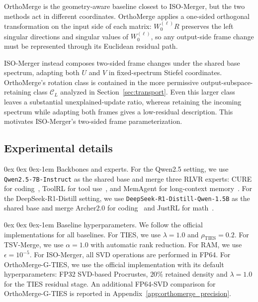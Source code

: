\documentclass[11pt, a4paper]{utda}
\makeatletter
\renewcommand{\paragraph}{%
  \@startsection{paragraph}{4}%
  {\z@}{0ex \@plus 0ex \@minus 0ex}{-1em}%
  {\normalfont\normalsize\bfseries}%
}
\theoremstyle{plain}
\theoremstyle{definition}
\theoremstyle{remark}
\makeatother
\begin{document}
OrthoMerge is the geometry-aware baseline closest to ISO-Merger, but the two
methods act in different coordinates. OrthoMerge applies a one-sided
orthogonal transformation on the input side of each matrix:
$W_0^{(\ell)}R$ preserves the left singular directions and singular values of
$W_0^{(\ell)}$, so any output-side frame change must be represented through
its Euclidean residual path.

ISO-Merger instead composes two-sided frame changes under the shared base
spectrum, adapting both $U$ and $V$ in fixed-spectrum Stiefel coordinates.
OrthoMerge's rotation class is contained in the more permissive
output-subspace-retaining class $\mathcal C_L$ analyzed in
Section~\ref{sec:transport}. Even this larger class leaves a substantial
unexplained-update ratio, whereas retaining the incoming spectrum while
adapting both frames gives a low-residual description. This motivates
ISO-Merger's two-sided frame parameterization.

\subsection{Experimental details}
\paragraph{Backbones and experts.}
For the Qwen2.5 setting, we use \texttt{Qwen2.5-7B-Instruct} as the shared base and merge three RLVR experts: CURE for coding~\cite{wang2025code}, ToolRL for tool use~\cite{qian2025toolrl}, and
MemAgent for long-context memory~\cite{yu2025memagent}. For the DeepSeek-R1-Distill setting, we use
\texttt{DeepSeek-R1-Distill-Qwen\allowbreak-1.5B} as the shared base and merge Archer2.0 for coding~\cite{archer} and JustRL for math~\cite{he2025justrl}.

\paragraph{Baseline hyperparameters.}
We follow the official implementations for all baselines. For TIES, we use
$\lambda=1.0$ and $\rho_{\mathrm{TIES}}=0.2$. For TSV-Merge, we use
$\alpha=1.0$ with automatic rank reduction. For RAM, we use
$\epsilon=10^{-5}$. For ISO-Merger, all SVD operations are performed in FP64. For OrthoMerge-G-TIES, we use the official implementation with its default
hyperparameters: FP32 SVD-based Procrustes, $20\%$ retained density and
$\lambda=1.0$ for the TIES residual stage. An additional FP64-SVD comparison for OrthoMerge-G-TIES is reported in
Appendix~\ref{app:orthomerge_precision}.
\end{document}

